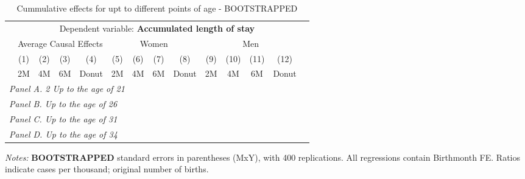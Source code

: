  \begin{table}[H] \begin{threeparttable} \centering \caption{Cummulative effects for upt to different points of age - BOOTSTRAPPED} {\def\sym#1{\ifmmode^{#1}\else\(^{#1}\)\fi} \begin{tabular}{l*{13}{c}} \toprule & \multicolumn{12}{c}{Dependent variable: \textbf{Accumulated length of stay}} \\ \cmidrule(lr){2-13}
            &\multicolumn{4}{c}{Average Causal Effects}         &\multicolumn{4}{c}{Women}                          &\multicolumn{4}{c}{Men}                            \\\cmidrule(lr){2-5}\cmidrule(lr){6-9}\cmidrule(lr){10-13}
            &\multicolumn{1}{c}{(1)}&\multicolumn{1}{c}{(2)}&\multicolumn{1}{c}{(3)}&\multicolumn{1}{c}{(4)}&\multicolumn{1}{c}{(5)}&\multicolumn{1}{c}{(6)}&\multicolumn{1}{c}{(7)}&\multicolumn{1}{c}{(8)}&\multicolumn{1}{c}{(9)}&\multicolumn{1}{c}{(10)}&\multicolumn{1}{c}{(11)}&\multicolumn{1}{c}{(12)}\\
            &\multicolumn{1}{c}{2M}&\multicolumn{1}{c}{4M}&\multicolumn{1}{c}{6M}&\multicolumn{1}{c}{Donut}&\multicolumn{1}{c}{2M}&\multicolumn{1}{c}{4M}&\multicolumn{1}{c}{6M}&\multicolumn{1}{c}{Donut}&\multicolumn{1}{c}{2M}&\multicolumn{1}{c}{4M}&\multicolumn{1}{c}{6M}&\multicolumn{1}{c}{Donut}\\
\midrule
 \multicolumn{13}{l}{\emph{Panel A. 2 Up to the age of 21}} \\   \midrule\multicolumn{13}{l}{\emph{Panel B. Up to the age of 26}} \\   \midrule\multicolumn{13}{l}{\emph{Panel C. Up to the age of 31}} \\   \midrule\multicolumn{13}{l}{\emph{Panel D. Up to the age of 34}} \\   
\bottomrule \end{tabular} } \begin{tablenotes} \item \scriptsize \emph{Notes:} \textbf{BOOTSTRAPPED} standard errors in parentheses (MxY), with 400 replications. All regressions contain Birthmonth FE. Ratios indicate cases per thousand; original number of births. \end{tablenotes} \end{threeparttable} \end{table} 
